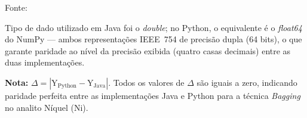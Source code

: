 \begin{table}[H]
\begin{threeparttable}
\begin{center}
\begin{minipage}{0.85\linewidth}
\begin{tablenotes}
\footnotesize
\item Fonte:~\oautor
\item[a] Tipo de dado utilizado em Java foi o \textit{double}; no Python,
o equivalente é o \textit{float64} do NumPy — ambos representações IEEE~754
de precisão dupla (64 bits), o que garante paridade ao nível da precisão exibida (quatro casas decimais) entre as
duas implementações.
\item \textbf{Nota:} $\Delta = |\text{Y}_{\text{Python}} - \text{Y}_{\text{Java}}|$.
Todos os valores de $\Delta$ são iguais a zero, indicando paridade
perfeita entre as implementações Java e Python para a técnica \textit{Bagging}
no analito Níquel (Ni).
\end{tablenotes}
\end{minipage}
\end{center}
\end{threeparttable}
\end{table}


